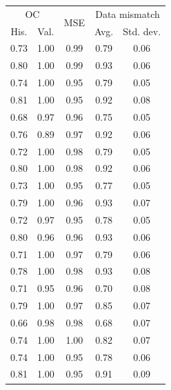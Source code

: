 \begin{tabular}{ccccc}
\toprule
\multicolumn{2}{c}{OC} & 
\multirow{2}{*}{
    MSE
} & 
\multicolumn{2}{c}{Data mismatch} 
\\
His. & Val. &  & Avg. & Std. dev.
\\
\midrule
0.73 & 1.00 & 0.99 & 0.79 & 0.06 \\
0.80 & 1.00 & 0.99 & 0.93 & 0.06 \\
\midrule
0.74 & 1.00 & 0.95 & 0.79 & 0.05 \\
0.81 & 1.00 & 0.95 & 0.92 & 0.08 \\
\midrule
0.68 & 0.97 & 0.96 & 0.75 & 0.05 \\
0.76 & 0.89 & 0.97 & 0.92 & 0.06 \\
\midrule
0.72 & 1.00 & 0.98 & 0.79 & 0.05 \\
0.80 & 1.00 & 0.98 & 0.92 & 0.06 \\
\midrule
0.73 & 1.00 & 0.95 & 0.77 & 0.05 \\
0.79 & 1.00 & 0.96 & 0.93 & 0.07 \\
\midrule
0.72 & 0.97 & 0.95 & 0.78 & 0.05 \\
0.80 & 0.96 & 0.96 & 0.93 & 0.06 \\
\midrule
0.71 & 1.00 & 0.97 & 0.79 & 0.06 \\
0.78 & 1.00 & 0.98 & 0.93 & 0.08 \\
\midrule
0.71 & 0.95 & 0.96 & 0.70 & 0.08 \\
0.79 & 1.00 & 0.97 & 0.85 & 0.07 \\
\midrule
0.66 & 0.98 & 0.98 & 0.68 & 0.07 \\
0.74 & 1.00 & 1.00 & 0.82 & 0.07 \\
\midrule
0.74 & 1.00 & 0.95 & 0.78 & 0.06 \\
0.81 & 1.00 & 0.95 & 0.91 & 0.09 \\
\bottomrule
\end{tabular}

